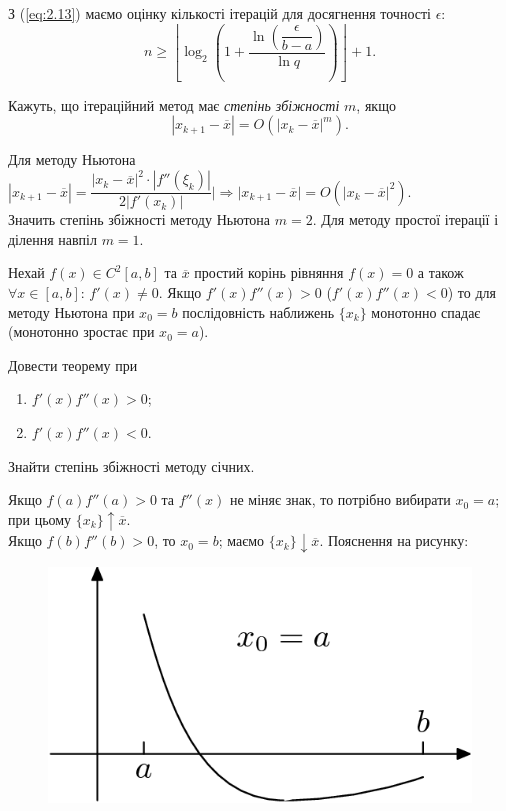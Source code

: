 З (\ref{eq:2.13}) маємо оцінку кількості ітерацій для досягнення точності $\epsilon$:
\[ n \ge \left\lfloor\log_2\left(1+\dfrac{\ln \left(\dfrac{\epsilon}{b-a}\right)}{\ln q}\right) \right\rfloor + 1 .\]

Кажуть, що ітераційний метод має \textit{степінь збіжності} $m$, якщо \[ |x_{k+1}-\overline{x}|=O(|x_k-\overline{x}|^m).\]

Для методу Ньютона $|x_{k+1}-\overline{x}| = \dfrac{|x_k-\overline{x}|^2\cdot|f''(\xi_k)|}{2|f'(x_k)|}| \Rightarrow |x_{k+1}-\overline{x}|=O(|x_k-\overline{x}|^2)$. \\

Значить степінь збіжності методу Ньютона $m=2$. Для методу простої ітерації і ділення навпіл $m=1$.

\begin{theorem}
	Нехай $f(x)\in C^2[a,b]$ та $\overline{x}$ простий корінь рівняння $f (x) = 0$ а також $\forall x\in[a,b]$: $f'(x) \ne 0$. Якщо $f'(x) f''(x) > 0$ ($f'(x) f''(x) < 0$) то для методу Ньютона при $x_0 = b$ послідовність наближень $\{x_k \}$ монотонно спадає (монотонно зростає при $x_0 = a$).
\end{theorem}

\begin{problem}
	Довести теорему при 
	\begin{enumerate}
		\item $f'(x) f''(x) > 0$;
		\item $f'(x) f''(x) < 0$.
	\end{enumerate}
\end{problem}

\begin{problem}
	Знайти степінь збіжності методу січних.
\end{problem}


Якщо $f(a) f''(a) > 0$ та $f''(x)$ не міняє знак, то потрібно вибирати $x_0 = a$; при цьому $\{x_k \}\uparrow \overline{x}$. \\

Якщо $f(b) f''(b) > 0$, то $x_0 = b$; маємо $\{x_k \}\downarrow \overline{x}$. Пояснення на рисунку:


\begin{figure}[H]
	\centering
	\includegraphics[width=.5\linewidth]{mal-2.png}
\end{figure}

